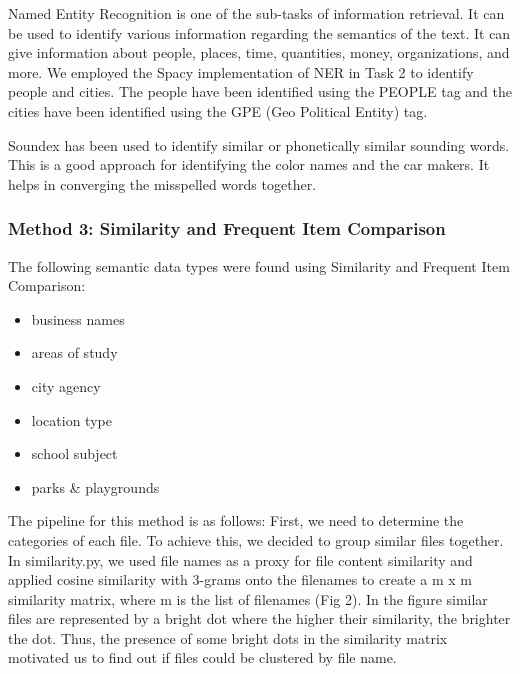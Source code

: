 \documentclass[sigconf,authordraft]{acmart}
\begin{document}
Named Entity Recognition is one of the sub-tasks of information retrieval. It can be used to identify various information regarding the semantics of the text. It can give information about people, places, time, quantities, money, organizations, and more. We employed the Spacy implementation of NER in Task 2 to identify people and cities. The people have been identified using the PEOPLE tag and the cities have been identified using the GPE (Geo Political Entity) tag.

Soundex has been used to identify similar or phonetically similar sounding words. This is a good approach for identifying the color names and the car makers. It helps in converging the misspelled words together. 

\subsubsection{Method 3: Similarity and Frequent Item Comparison}
The following semantic data types were found using Similarity and Frequent Item Comparison:
\begin{itemize}
    \item business names
    \item areas of study
    \item city agency
    \item location type
    \item school subject
    \item parks & playgrounds
\end{itemize}

The pipeline for this method is as follows: First, we need to determine the categories of each file. To achieve this, we decided to group similar files together. In similarity.py, we used file names as a proxy for file content similarity and applied cosine similarity with 3-grams onto the filenames to create a m x m similarity matrix, where m is the list of filenames (Fig 2). In the figure similar files are represented by a bright dot where the higher their similarity, the brighter the dot. Thus, the presence of some bright dots in the similarity matrix motivated us to find out if files could be clustered by file name.
\end{document}

